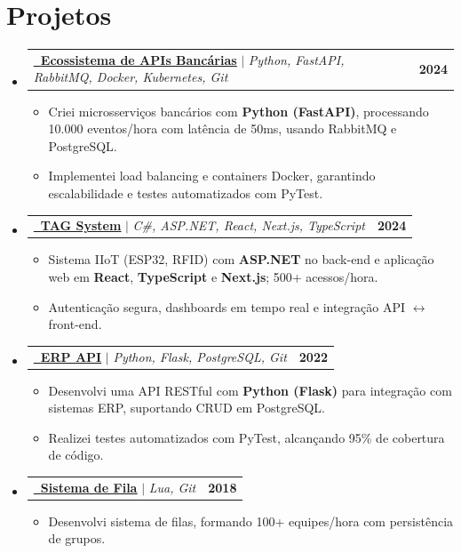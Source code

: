 \documentclass[letterpaper,11pt]{article}
\makeatletter
\newcommand{\resumeItem}[1]{
  \item\small{
    {#1 \vspace{-2pt}}
  }
}
\newcommand{\resumeProjectHeading}[2]{
    \item
    \begin{tabular*}{1.001\textwidth}{l@{\extracolsep{\fill}}r}
      \small#1 & \textbf{\small #2}\\
    \end{tabular*}\vspace{-7pt}
}
\newcommand{\resumeSubHeadingListStart}{\begin{itemize}[leftmargin=0.0in, label={}]}
\newcommand{\resumeSubHeadingListEnd}{\end{itemize}}
\newcommand{\resumeItemListStart}{\begin{itemize}}
\newcommand{\resumeItemListEnd}{\end{itemize}\vspace{-5pt}}
\makeatother
\begin{document}
\section{Projetos}
    \vspace{-5pt}
    \resumeSubHeadingListStart
      \resumeProjectHeading
        {\textbf{\href{https://github.com/scryng/apis_banking_ecosystem}{\raisebox{-0.2\height}\faGithub\ \underline{Ecossistema de APIs Bancárias}}} $|$ \emph{Python, FastAPI, RabbitMQ, Docker, Kubernetes, Git}}{2024}
        \resumeItemListStart
            \resumeItem{Criei microsserviços bancários com \textbf{Python (FastAPI)}, processando 10.000 eventos/hora com latência de 50ms, usando RabbitMQ e PostgreSQL.}
            \resumeItem{Implementei load balancing e containers Docker, garantindo escalabilidade e testes automatizados com PyTest.}
        \resumeItemListEnd
        \vspace{-12pt}
      \resumeProjectHeading
        {\textbf{\href{https://github.com/scryng/tag_system}{\raisebox{-0.2\height}\faGithub\ \underline{TAG System}}} $|$ \emph{C\#, ASP.NET, React, Next.js, TypeScript}}{2024}
        \resumeItemListStart
            \resumeItem{Sistema IIoT (ESP32, RFID) com \textbf{ASP.NET} no back-end e aplicação web em \textbf{React}, \textbf{TypeScript} e \textbf{Next.js}; 500+ acessos/hora.}
            \resumeItem{Autenticação segura, dashboards em tempo real e integração API $\leftrightarrow$ front-end.}
        \resumeItemListEnd
        \vspace{-12pt}
      \resumeProjectHeading
        {\textbf{\href{https://github.com/scryng/flask_erp_api}{\raisebox{-0.2\height}\faGithub\ \underline{ERP API}}} $|$ \emph{Python, Flask, PostgreSQL, Git}}{2022}
        \resumeItemListStart
            \resumeItem{Desenvolvi uma API RESTful com \textbf{Python (Flask)} para integração com sistemas ERP, suportando CRUD em PostgreSQL.}
            \resumeItem{Realizei testes automatizados com PyTest, alcançando 95\% de cobertura de código.}
        \resumeItemListEnd
        \vspace{-12pt}
      \resumeProjectHeading
        {\textbf{\href{https://github.com/scryng/queue_challenge_for_5v5_matches}{\raisebox{-0.2\height}\faGithub\ \underline{Sistema de Fila}}} $|$ \emph{Lua, Git}}{2018}
        \resumeItemListStart
            \resumeItem{Desenvolvi sistema de filas, formando 100+ equipes/hora com persistência de grupos.}
        \resumeItemListEnd
    \resumeSubHeadingListEnd
\vspace{-10pt}
\end{document}
